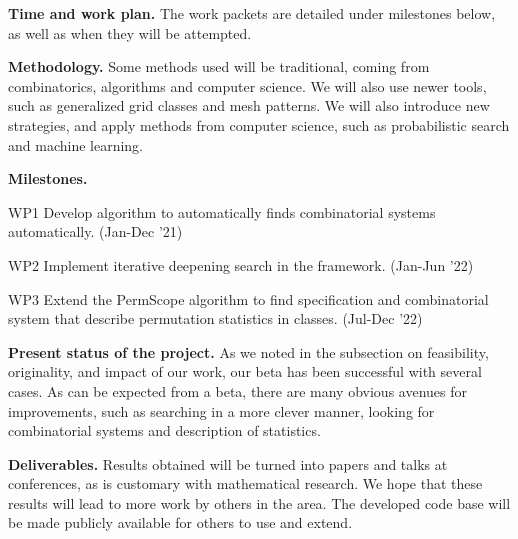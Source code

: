 \documentclass{rannis}
\newcommand{\tilealg}{\textsf{PermScope}}
\newcommand{\yearofappls}{21}
\newcommand{\yearofapplsp}{22}
\theoremstyle{definition}
\newenvironment{packed_enum}{
\begin{enumerate}
  \setlength{\itemsep}{-1pt}
  \setlength{\parskip}{-1pt}
  \setlength{\parsep}{-1pt}
}{\end{enumerate}}
\begin{document}
\noindent \textbf{Time and work plan.}
The work packets are detailed under milestones below, as well as when they will
be attempted.

\noindent\textbf{Methodology.}
Some methods used will be traditional, coming from combinatorics, algorithms and
computer science. We will also use newer tools, such as generalized grid classes
and mesh patterns. We will also introduce new strategies, and
apply methods from computer science, such as probabilistic search and machine
learning.

\noindent \textbf{Milestones.}
\begin{packed_enum}

\item[WP1] Develop algorithm to automatically finds combinatorial systems
    automatically.  (Jan-Dec '\yearofappls)
\item[WP2] Implement iterative deepening search in the framework. (Jan-Jun '\yearofapplsp)
\item[WP3] Extend the \tilealg{} algorithm to find specification and
    combinatorial system that describe permutation statistics in classes.
    (Jul-Dec '\yearofapplsp)

\end{packed_enum}

\noindent\textbf{Present status of the project.} As we noted in the subsection on
feasibility, originality, and impact of our work, our beta has been successful
with several cases. As can be expected from a beta, there are many
obvious avenues for improvements, such as
searching in a more clever manner, looking for combinatorial systems and
description of statistics.

\noindent\textbf{Deliverables.}
Results obtained will be turned into papers and talks at conferences, as is
customary with mathematical research.  We hope that these results will lead to
more work by others in the area. The developed code base will be made publicly
available for others to use and extend.
\\

\end{document}
